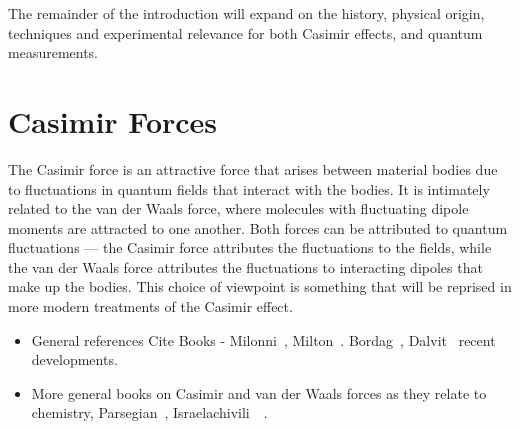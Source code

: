The remainder of the introduction will expand on the history, physical origin, techniques and experimental 
relevance for both Casimir effects, and quantum measurements.  



\section{Casimir Forces}%

The Casimir force is an attractive force that arises between material bodies due to fluctuations in quantum fields
that interact with the bodies.  It is intimately related to the van der Waals force, where 
molecules with fluctuating dipole moments are attracted to one another.  Both forces can be attributed 
to quantum fluctuations --- the Casimir force attributes the fluctuations to the fields, while
the van der Waals force attributes the fluctuations to interacting dipoles that make up the bodies.  
This choice of viewpoint is something that will be reprised in more modern treatments of the Casimir effect.  

\begin{itemize}
\item General references Cite Books - Milonni~\cite{Milonni1994}, Milton~\cite{Milton2001}.
  Bordag~\cite{Bordag2009}, Dalvit~\cite{Dalvit2011} recent developments.  
\item More general books on Casimir and van der Waals forces as they relate to chemistry, 
  Parsegian~\cite{Parsegian2006}, Israelachivili~\etal~\cite{Israelachvili2011}.
\end{itemize}

